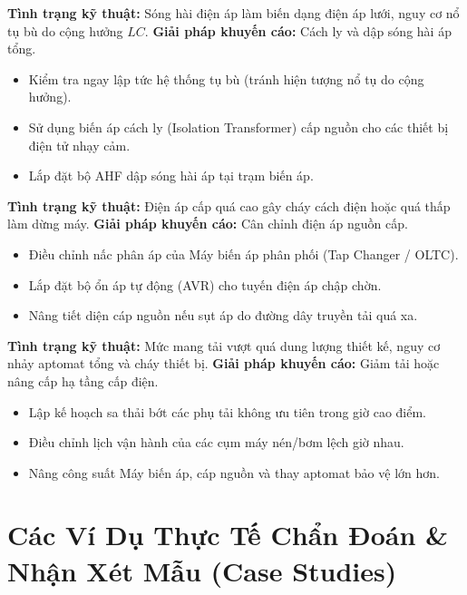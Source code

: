 \documentclass[12pt,a4paper]{article}
\begin{document}
\begin{description}[style=nextline,leftmargin=1.5em,labelindent=0pt,itemsep=0.8em]
  \item[\color{primary}\textbf{4. Sóng hài điện áp nghiêm trọng ($THD_V > 8{,}0\%$)}]
  \textbf{Tình trạng kỹ thuật:} Sóng hài điện áp làm biến dạng điện áp lưới, nguy cơ nổ tụ bù do cộng hưởng $LC$.
  \textbf{Giải pháp khuyến cáo:} Cách ly và dập sóng hài áp tổng.
  \begin{itemize}
    \item Kiểm tra ngay lập tức hệ thống tụ bù (tránh hiện tượng nổ tụ do cộng hưởng).
    \item Sử dụng biến áp cách ly (Isolation Transformer) cấp nguồn cho các thiết bị điện tử nhạy cảm.
    \item Lắp đặt bộ AHF dập sóng hài áp tại trạm biến áp.
  \end{itemize}

  \item[\color{primary}\textbf{5. Điện áp trôi ngoài dải ($\delta U$ vượt $\pm 5\%$)}]
  \textbf{Tình trạng kỹ thuật:} Điện áp cấp quá cao gây cháy cách điện hoặc quá thấp làm dừng máy.
  \textbf{Giải pháp khuyến cáo:} Cân chỉnh điện áp nguồn cấp.
  \begin{itemize}
    \item Điều chỉnh nấc phân áp của Máy biến áp phân phối (Tap Changer / OLTC).
    \item Lắp đặt bộ ổn áp tự động (AVR) cho tuyến điện áp chập chờn.
    \item Nâng tiết diện cáp nguồn nếu sụt áp do đường dây truyền tải quá xa.
  \end{itemize}

  \item[\color{primary}\textbf{6. Quá tải công suất ($\%P_{\text{đm}} > 105\%$)}]
  \textbf{Tình trạng kỹ thuật:} Mức mang tải vượt quá dung lượng thiết kế, nguy cơ nhảy aptomat tổng và cháy thiết bị.
  \textbf{Giải pháp khuyến cáo:} Giảm tải hoặc nâng cấp hạ tầng cấp điện.
  \begin{itemize}
    \item Lập kế hoạch sa thải bớt các phụ tải không ưu tiên trong giờ cao điểm.
    \item Điều chỉnh lịch vận hành của các cụm máy nén/bơm lệch giờ nhau.
    \item Nâng công suất Máy biến áp, cáp nguồn và thay aptomat bảo vệ lớn hơn.
  \end{itemize}
\end{description}

\clearpage
\section{Các Ví Dụ Thực Tế Chẩn Đoán \& Nhận Xét Mẫu (Case Studies)}
\end{document}
